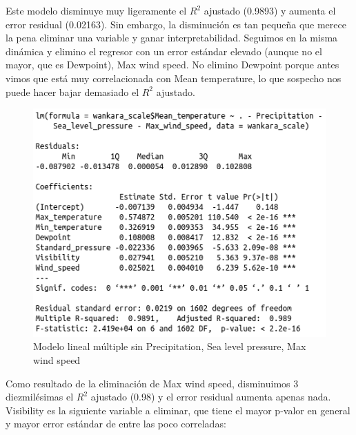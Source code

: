 Este modelo disminuye muy ligeramente el $R^2$ ajustado (0.9893) y aumenta el error residual (0.02163). Sin embargo, la disminución es tan pequeña que merece la pena eliminar una variable y ganar interpretabilidad. Seguimos en la misma dinámica y elimino el regresor con un error estándar elevado (aunque no el mayor, que es Dewpoint), Max wind speed. No elimino Dewpoint porque antes vimos que está muy correlacionada con Mean temperature, lo que sospecho nos puede hacer bajar demasiado el $R^2$ ajustado.

\begin{figure}[H] %
	\centering
	\includegraphics[scale=0.6]{mlm4.png}  %
	\caption{Modelo lineal múltiple sin Precipitation, Sea level pressure, Max wind speed} 
	\label{fig:mlm4}
\end{figure}

Como resultado de la eliminación de Max wind speed, disminuimos 3 diezmilésimas el $R^2$ ajustado (0.98) y el error residual aumenta apenas nada. Visibility es la siguiente variable a eliminar, que tiene el mayor p-valor en general y mayor error estándar de entre las poco correladas:

